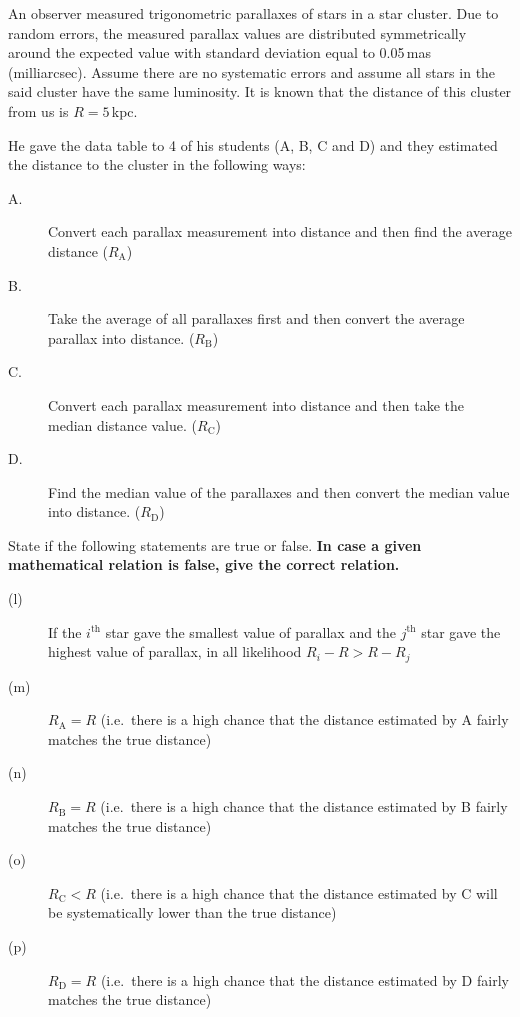 An observer measured trigonometric parallaxes of stars in a star cluster. Due
to random errors, the measured parallax values are distributed symmetrically
around the expected value with standard deviation equal to 0.05\,mas
(milliarcsec). Assume there are no systematic errors and assume all stars in
the said cluster have the same luminosity. It is known that the distance of
this cluster from us is $R = 5$\,kpc.

He gave the data table to 4 of his students (A, B, C and D) and they estimated
the distance to the cluster in the following ways:

\begin{description}
\item[A.] Convert each parallax measurement into distance and then find the
  average distance ($R_{\mathrm{A}}$)
\item[B.] Take the average of all parallaxes first and then convert the average
  parallax into distance. ($R_{\mathrm{B}}$)
\item[C.] Convert each parallax measurement into distance and then take the
  median distance value. ($R_{\mathrm{C}}$)
\item[D.] Find the median value of the parallaxes and then convert the median
  value into distance. ($R_{\mathrm{D}}$)
\end{description}

State if the following statements are true or false. \textbf{In case a given
mathematical relation is false, give the correct relation.}

\begin{description}
\item[(l)] If the $i^{\mathrm{th}}$ star gave the smallest value of parallax
  and the $j^{\mathrm{th}}$ star gave the highest value of parallax, in all
  likelihood $R_i - R > R - R_j$
\item[(m)] $R_{\mathrm{A}} = R$ (i.e.\ there is a high chance that the distance
  estimated by A fairly matches the true distance)
\item[(n)] $R_{\mathrm{B}} = R$ (i.e.\ there is a high chance that the distance
  estimated by B fairly matches the true distance)
\item[(o)] $R_{\mathrm{C}} < R$ (i.e.\ there is a high chance that the distance
  estimated by C will be systematically lower than the true distance)
\item[(p)] $R_{\mathrm{D}} = R$ (i.e.\ there is a high chance that the distance
  estimated by D fairly matches the true distance)
\end{description}
